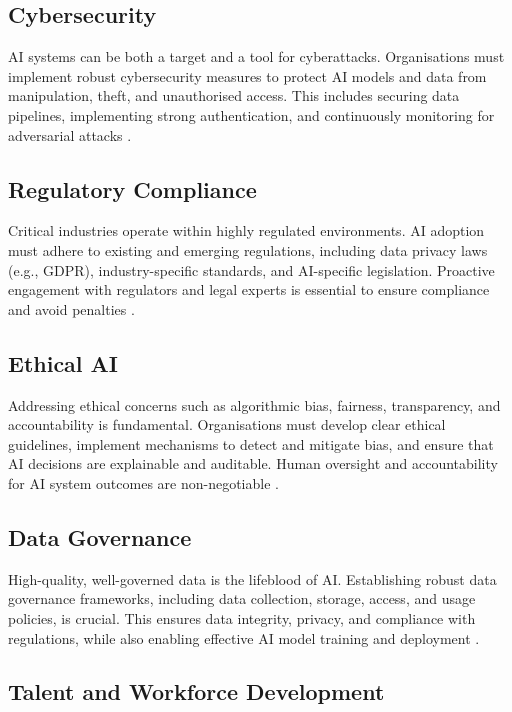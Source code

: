 \subsection{Cybersecurity}

AI systems can be both a target and a tool for cyberattacks. Organisations must implement robust cybersecurity measures to protect AI models and data from manipulation, theft, and unauthorised access. This includes securing data pipelines, implementing strong authentication, and continuously monitoring for adversarial attacks \parencite{cisc2025artificial}.

\subsection{Regulatory Compliance}

Critical industries operate within highly regulated environments. AI adoption must adhere to existing and emerging regulations, including data privacy laws (e.g., GDPR), industry-specific standards, and AI-specific legislation. Proactive engagement with regulators and legal experts is essential to ensure compliance and avoid penalties \parencite{dhs2024roles}.

\subsection{Ethical AI}

Addressing ethical concerns such as algorithmic bias, fairness, transparency, and accountability is fundamental. Organisations must develop clear ethical guidelines, implement mechanisms to detect and mitigate bias, and ensure that AI decisions are explainable and auditable. Human oversight and accountability for AI system outcomes are non-negotiable \parencite{leyliabadi2025conceptual}.

\subsection{Data Governance}

High-quality, well-governed data is the lifeblood of AI. Establishing robust data governance frameworks, including data collection, storage, access, and usage policies, is crucial. This ensures data integrity, privacy, and compliance with regulations, while also enabling effective AI model training and deployment \parencite{cisc2025artificial}.

\subsection{Talent and Workforce Development}

